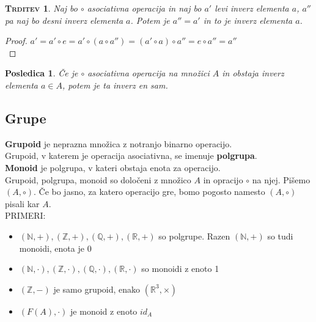 \documentclass[a4paper,12pt]{article}
\newtheorem*{trditev}{\textsc{Trditev}}
\newtheorem*{posl}{Posledica}
\begin{document}
\begin{trditev}
Naj bo $\circ$ asociativna operacija in naj bo $a'$ levi inverz elementa $a$, $a''$ pa naj bo desni inverz elementa $a$. Potem je $a''=a'$ in to je inverz elementa $a$.\\
\end{trditev}

\begin{proof}
$a'=a'\circ e=a'\circ(a\circ a'')=(a'\circ a)\circ a''=e\circ a''=a''$\\
\end{proof}

\begin{posl}
Če je $\circ$ asociativna operacija na množici $A$ in obstaja inverz elementa $a \in A$, potem je ta inverz en sam.\\
\end{posl}

\newpage

\begin{center}
\subsection{Grupe}
\end{center}

\noindent \textbf{Grupoid} je neprazna množica z notranjo binarno operacijo. \\

\noindent Grupoid, v katerem je operacija asociativna, se imenuje \textbf{polgrupa}. \\

\noindent \textbf{Monoid} je polgrupa, v kateri obstaja enota za operacijo. \\

\noindent Grupoid, polgrupa, monoid so določeni z množico $A$ in opracijo $\circ$ na njej. Pišemo $(A,\circ)$. Če bo jasno, za katero operacijo gre, bomo pogosto namesto $(A,\circ)$ pisali kar $A$. \\

\noindent PRIMERI:
\begin{itemize}
\item $(\mathbb{N},+), (\mathbb{Z},+), (\mathbb{Q},+), (\mathbb{R},+)$ so polgrupe. Razen $(\mathbb{N},+)$ so tudi monoidi, enota je 0
\item $(\mathbb{N},\cdot), (\mathbb{Z},\cdot), (\mathbb{Q},\cdot), (\mathbb{R},\cdot)$ so monoidi z enoto 1
\item $(\mathbb{Z},-)$ je samo grupoid, enako $(\mathbb{R}^3,\times)$
\item $(F(A),\cdot)$ je monoid z enoto $id_A$ \\
\end{itemize}
\end{document}
